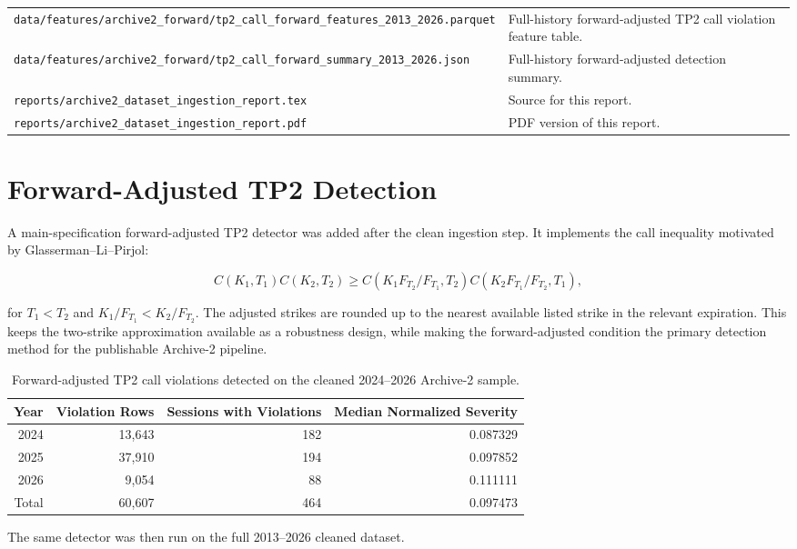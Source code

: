 \documentclass[11pt]{article}
\begin{document}
\begin{longtable}{>{\raggedright\arraybackslash}p{}p{}}
\texttt{data/features/archive2\_forward/tp2\_call\_forward\_features\_2013\_2026.parquet} & Full-history forward-adjusted TP2 call violation feature table. \\
\texttt{data/features/archive2\_forward/tp2\_call\_forward\_summary\_2013\_2026.json} & Full-history forward-adjusted detection summary. \\
\texttt{reports/archive2\_dataset\_ingestion\_report.tex} & Source for this report. \\
\texttt{reports/archive2\_dataset\_ingestion\_report.pdf} & PDF version of this report. \\
\bottomrule
\end{longtable}

\section*{Forward-Adjusted TP2 Detection}

A main-specification forward-adjusted TP2 detector was added after the clean
ingestion step. It implements the call inequality motivated by
Glasserman--Li--Pirjol:

\[
C(K_1,T_1)C(K_2,T_2)
\geq
C(K_1F_{T_2}/F_{T_1},T_2)C(K_2F_{T_1}/F_{T_2},T_1),
\]

for $T_1 < T_2$ and $K_1/F_{T_1} < K_2/F_{T_2}$. The adjusted strikes are
rounded up to the nearest available listed strike in the relevant expiration.
This keeps the two-strike approximation available as a robustness design, while
making the forward-adjusted condition the primary detection method for the
publishable Archive-2 pipeline.

\begin{table}[h]
\centering
\begin{tabular}{rrrr}
\toprule
Year & Violation Rows & Sessions with Violations & Median Normalized Severity \\
\midrule
2024 & 13,643 & 182 & 0.087329 \\
2025 & 37,910 & 194 & 0.097852 \\
2026 & 9,054 & 88 & 0.111111 \\
\midrule
Total & 60,607 & 464 & 0.097473 \\
\bottomrule
\end{tabular}
\caption{Forward-adjusted TP2 call violations detected on the cleaned 2024--2026 Archive-2 sample.}
\end{table}

The same detector was then run on the full 2013--2026 cleaned dataset.
\end{document}

